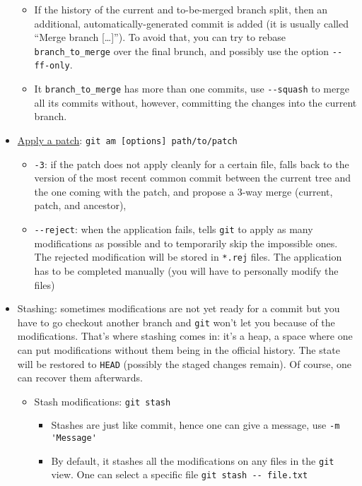 \documentclass[a4paper,12pt,%
              final%
              ]{article}
\begin{document}
\begin{itemize}
    \begin{itemize}
      \item If the history of the current and to-be-merged branch split, then an additional, automatically-generated commit is added (it is usually called ``Merge branch [\ldots]''). To avoid that, you can try to rebase \verb|branch_to_merge| over the final brunch, and possibly use the option \verb|--ff-only|.
      \item It \verb|branch_to_merge| has more than one commits, use \verb|--squash| to merge all its commits without, however, committing the changes into the current branch.
    \end{itemize}
  \item \href{https://git-scm.com/docs/git-am}{Apply a patch}: \verb|git am [options] path/to/patch|
    \begin{itemize}
      \item \texttt{-3}: if the patch does not apply cleanly for a certain file, falls back to the version of the most recent common commit between the current tree and the one coming with the patch, and propose a 3-way merge (current, patch, and ancestor),
      \item \verb|--reject|: when the application fails, tells \texttt{git} to apply as many modifications as possible and to temporarily skip the impossible ones. The rejected modification will be stored in \texttt{*.rej} files. The application has to be completed manually (you will have to personally modify the files)
    \end{itemize}
  \item Stashing: sometimes modifications are not yet ready for a commit but you have to go checkout another branch and \texttt{git} won't let you because of the modifications. That's where stashing comes in: it's a heap, a space where one can put modifications without them being in the official history. The state will be restored to \texttt{HEAD} (possibly the staged changes remain). Of course, one can recover them afterwards.
    \begin{itemize}
      \item Stash modifications: \texttt{git stash}
        \begin{itemize}
          \item Stashes are just like commit, hence one can give a message, use \verb|-m 'Message'|
          \item By default, it stashes all the modifications on any files in the \texttt{git} view. One can select a specific file \verb|git stash -- file.txt|

\end{itemize}
\end{itemize}
\end{itemize}
\end{document}
